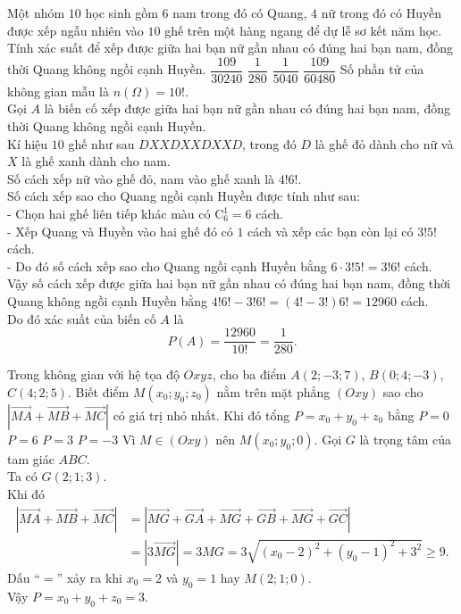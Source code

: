 \begin{ex}%
 Một nhóm $10$ học sinh gồm $6$ nam trong đó có Quang, $4$ nữ trong đó có Huyền được xếp ngẫu nhiên vào $10$ ghế trên một hàng ngang để dự lễ sơ kết năm học. Tính xác suất để xếp được giữa hai bạn nữ gần nhau có đúng hai bạn nam, đồng thời Quang không ngồi cạnh Huyền.
 \choice
  {$\dfrac{109}{30240}$}
  {\True $\dfrac{1}{280}$}
  {$\dfrac{1}{5040}$}
  {$\dfrac{109}{60480}$}
 \loigiai
  {
  Số phần tử của không gian mẫu là $n(\Omega) = 10!$.\\
  Gọi $A$ là biến cố xếp được giữa hai bạn nữ gần nhau có đúng hai bạn nam, đồng thời Quang không ngồi cạnh Huyền.\\
  Kí hiệu $10$ ghế như sau $DXXDXXDXXD$, trong đó $D$ là ghế đỏ dành cho nữ và $X$ là ghế xanh dành cho nam.\\
  Số cách xếp nữ vào ghế đỏ, nam vào ghế xanh là $4!6!$.\\
  Số cách xếp sao cho Quang ngồi cạnh Huyền được tính như sau:\\
  - Chọn hai ghế liên tiếp khác màu có $\mathrm{C}_6^1 = 6$ cách.\\
  - Xếp Quang và Huyền vào hai ghế đó có $1$ cách và xếp các bạn còn lại có $3!5!$ cách.\\
  - Do đó số cách xếp sao cho Quang ngồi cạnh Huyền bằng $6 \cdot 3!5! = 3!6!$ cách.\\
  Vậy số cách xếp được giữa hai bạn nữ gần nhau có đúng hai bạn nam, đồng thời Quang không ngồi cạnh Huyền bằng $4!6! - 3!6! = (4! - 3!)6! = 12960$ cách.\\
  Do đó xác suất của biến cố $A$ là
  $$P(A) = \dfrac{12960}{10!} = \dfrac{1}{280}.$$
  }
\end{ex}


\begin{ex}%
 Trong không gian với hệ tọa độ $Oxyz$, cho ba điểm $A(2;-3;7)$, $B(0;4;-3)$, $C(4;2;5)$. Biết điểm $M(x_0;y_0;z_0)$ nằm trên mặt phẳng $(Oxy)$ sao cho $\left| \vec{MA} + \vec{MB} + \vec{MC} \right|$ có giá trị nhỏ nhất. Khi đó tổng $P = x_0 + y_0 + z_0$ bằng
 \choice
  {$P = 0$}
  {$P = 6$}
  {\True $P = 3$}
  {$P = -3$}
 \loigiai
  {
  Vì $M \in (Oxy)$ nên $M(x_0;y_0;0)$.
  Gọi $G$ là trọng tâm của tam giác $ABC$.\\
  Ta có $G(2;1;3)$.\\
  Khi đó
  \begin{align*}
   \left| \vec{MA} + \vec{MB} + \vec{MC} \right| & = \left| \vec{MG} + \vec{GA} + \vec{MG} + \vec{GB} + \vec{MG} + \vec{GC} \right| \\
   & = \left| 3 \vec{MG} \right| = 3MG = 3\sqrt{(x_0 - 2)^2 + (y_0 - 1)^2 + 3^2} \geq 9.
  \end{align*}
  Dấu ``$=$'' xảy ra khi $x_0 = 2$ và $y_0 = 1$ hay $M(2;1;0)$.\\
  Vậy $P = x_0 + y_0 + z_0 = 3$.
  }
\end{ex}



